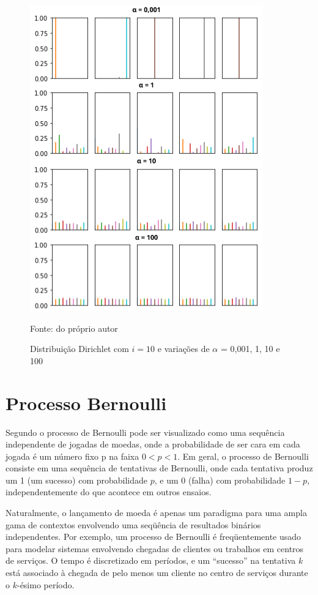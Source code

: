 \begin{figure}[!h]
	\centering
	\includegraphics[keepaspectratio=true,scale=0.7]{figuras/dist-diri-var.png}
	\caption{Distribuição Dirichlet com $i=10$ e variações de $\alpha$ = 0,001, 1, 10 e 100 }
	Fonte: do próprio autor
	\label{fig09}
\end{figure}



\section{Processo Bernoulli}

Segundo \cite{bertsekas2008} o processo de Bernoulli pode ser visualizado como uma sequência independente de jogadas de moedas, onde a probabilidade de ser cara em cada jogada é um número fixo p na faixa $0 < p < 1$. Em geral, o processo de Bernoulli consiste em uma sequência de tentativas de Bernoulli, onde cada tentativa produz um 1 (um sucesso) com probabilidade $p$, e um 0 (falha) com probabilidade $1 - p$, independentemente do que acontece em outros ensaios.

Naturalmente, o lançamento de moeda é apenas um paradigma para uma ampla gama de contextos envolvendo uma seqüência de resultados binários independentes. Por exemplo, um processo de Bernoulli é freqüentemente usado para modelar sistemas envolvendo chegadas de clientes ou trabalhos em centros de serviços. O tempo é discretizado em períodos, e um “sucesso” na tentativa $k$ está associado à chegada de pelo menos um cliente no centro de serviços durante o $k$-ésimo período.

